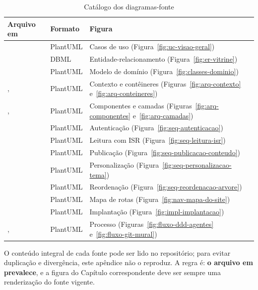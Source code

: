 \begin{table}[htb]
\caption{Catálogo dos diagramas-fonte}\label{tab:catalogo-diagramas}
\small
\begin{tabularx}{\linewidth}{@{}L{4.6cm}L{2.6cm}Y@{}}
\toprule
\textbf{Arquivo em } & \textbf{Formato} & \textbf{Figura}\\
\midrule
{} & PlantUML & Casos de uso (Figura~\ref{fig:uc-visao-geral})\\
 & DBML & Entidade-relacionamento (Figura~\ref{fig:er-vitrine})\\
 & PlantUML & Modelo de domínio (Figura~\ref{fig:classes-dominio})\\
,  & PlantUML & Contexto e contêineres (Figuras~\ref{fig:arq-contexto} e~\ref{fig:arq-conteineres})\\
,  & PlantUML & Componentes e camadas (Figuras~\ref{fig:arq-componentes} e~\ref{fig:arq-camadas})\\
 & PlantUML & Autenticação (Figura~\ref{fig:seq-autenticacao})\\
 & PlantUML & Leitura com ISR (Figura~\ref{fig:seq-leitura-isr})\\
 & PlantUML & Publicação (Figura~\ref{fig:seq-publicacao-conteudo})\\
 & PlantUML & Personalização (Figura~\ref{fig:seq-personalizacao-tema})\\
 & PlantUML & Reordenação (Figura~\ref{fig:seq-reordenacao-arvore})\\
 & PlantUML & Mapa de rotas (Figura~\ref{fig:nav-mapa-do-site})\\
 & PlantUML & Implantação (Figura~\ref{fig:impl-implantacao})\\
,  & PlantUML & Processo (Figuras~\ref{fig:fluxo-ddd-agentes} e~\ref{fig:fluxo-git-mural})\\
\bottomrule
\end{tabularx}
\end{table}

O conteúdo integral de cada fonte pode ser lido no repositório; para evitar duplicação e divergência, este apêndice não o reproduz. A regra é: \textbf{o arquivo em  prevalece}, e a figura do Capítulo correspondente deve ser sempre uma renderização do fonte vigente.
